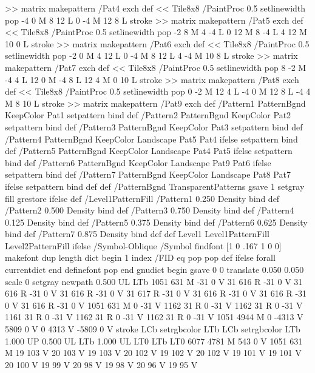 {{{>> matrix makepattern
/Pat4 exch def
<< Tile8x8
 /PaintProc {0.5 setlinewidth pop -4 0 M 8 12 L
	0 -4 M 12 8 L stroke}
>> matrix makepattern
/Pat5 exch def
<< Tile8x8
 /PaintProc {0.5 setlinewidth pop -2 8 M 4 -4 L
	0 12 M 8 -4 L 4 12 M 10 0 L stroke}
>> matrix makepattern
/Pat6 exch def
<< Tile8x8
 /PaintProc {0.5 setlinewidth pop -2 0 M 4 12 L
	0 -4 M 8 12 L 4 -4 M 10 8 L stroke}
>> matrix makepattern
/Pat7 exch def
<< Tile8x8
 /PaintProc {0.5 setlinewidth pop 8 -2 M -4 4 L
	12 0 M -4 8 L 12 4 M 0 10 L stroke}
>> matrix makepattern
/Pat8 exch def
<< Tile8x8
 /PaintProc {0.5 setlinewidth pop 0 -2 M 12 4 L
	-4 0 M 12 8 L -4 4 M 8 10 L stroke}
>> matrix makepattern
/Pat9 exch def
/Pattern1 {PatternBgnd KeepColor Pat1 setpattern} bind def
/Pattern2 {PatternBgnd KeepColor Pat2 setpattern} bind def
/Pattern3 {PatternBgnd KeepColor Pat3 setpattern} bind def
/Pattern4 {PatternBgnd KeepColor Landscape {Pat5} {Pat4} ifelse setpattern} bind def
/Pattern5 {PatternBgnd KeepColor Landscape {Pat4} {Pat5} ifelse setpattern} bind def
/Pattern6 {PatternBgnd KeepColor Landscape {Pat9} {Pat6} ifelse setpattern} bind def
/Pattern7 {PatternBgnd KeepColor Landscape {Pat8} {Pat7} ifelse setpattern} bind def
} def
%
%
%
/PatternBgnd {
  TransparentPatterns {} {gsave 1 setgray fill grestore} ifelse
} def
%
%
/Level1PatternFill {
/Pattern1 {0.250 Density} bind def
/Pattern2 {0.500 Density} bind def
/Pattern3 {0.750 Density} bind def
/Pattern4 {0.125 Density} bind def
/Pattern5 {0.375 Density} bind def
/Pattern6 {0.625 Density} bind def
/Pattern7 {0.875 Density} bind def
} def
%
%
Level1 {Level1PatternFill} {Level2PatternFill} ifelse
%
/Symbol-Oblique /Symbol findfont [1 0 .167 1 0 0] makefont
dup length dict begin {1 index /FID eq {pop pop} {def} ifelse} forall
currentdict end definefont pop
end
gnudict begin
gsave
0 0 translate
0.050 0.050 scale
0 setgray
newpath
0.500 UL
LTb
1051 631 M
-31 0 V
31 616 R
-31 0 V
31 616 R
-31 0 V
31 616 R
-31 0 V
31 617 R
-31 0 V
31 616 R
-31 0 V
31 616 R
-31 0 V
31 616 R
-31 0 V
1051 631 M
0 -31 V
1162 31 R
0 -31 V
1162 31 R
0 -31 V
1161 31 R
0 -31 V
1162 31 R
0 -31 V
1162 31 R
0 -31 V
1051 4944 M
0 -4313 V
5809 0 V
0 4313 V
-5809 0 V
stroke
LCb setrgbcolor
LTb
LCb setrgbcolor
LTb
1.000 UP
0.500 UL
LTb
1.000 UL
LT0
LTb
LT0
6077 4781 M
543 0 V
1051 631 M
19 103 V
20 103 V
19 103 V
20 102 V
19 102 V
20 102 V
19 101 V
19 101 V
20 100 V
19 99 V
20 98 V
19 98 V
20 96 V
19 95 V
}}
